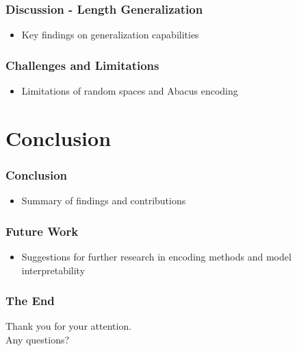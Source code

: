 \documentclass[14pt,aspectratio=169]{beamer}
\theoremstyle{remark}
\begin{document}
\begin{frame}
    \frametitle{Discussion - Length Generalization}
    \begin{itemize}
        \item Key findings on generalization capabilities
    \end{itemize}
\end{frame}

\begin{frame}
    \frametitle{Challenges and Limitations}
    \begin{itemize}
        \item Limitations of random spaces and Abacus encoding
    \end{itemize}
\end{frame}

\section{Conclusion}

\begin{frame}
    \frametitle{Conclusion}
    \begin{itemize}
        \item Summary of findings and contributions
    \end{itemize}
\end{frame}

\begin{frame}
    \frametitle{Future Work}
    \begin{itemize}
        \item Suggestions for further research in encoding methods and model interpretability
    \end{itemize}
\end{frame}

\begin{frame}
    \frametitle{The End}
    \begin{center}
        Thank you for your attention. \\[1ex]
        Any questions?
    \end{center}
\end{frame}
\end{document}
